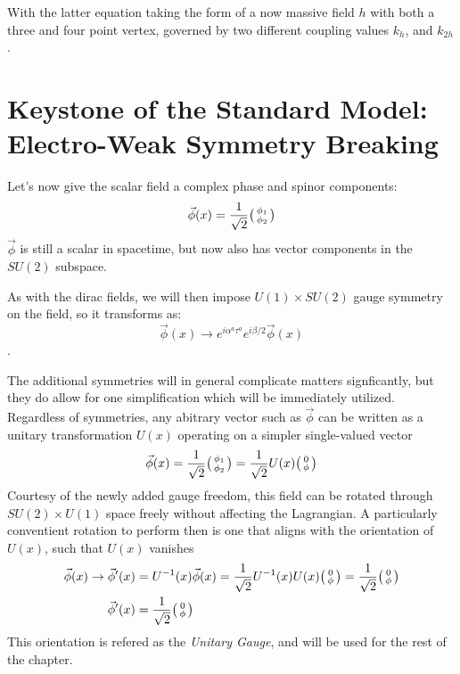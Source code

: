     With the latter equation taking the form of a now massive field $h$ with both a three and four point vertex,
        governed by two different coupling values $k_{h}$, and $k_{2h}$.

    \cite{Halzen_book}

    

\section{Keystone of the Standard Model: Electro-Weak Symmetry Breaking}

    Let's now give the scalar field a complex phase and spinor components:
    \begin{equation}
        \vec{\phi}(x) = \frac{1}{\sqrt{2}} \big(\begin{smallmatrix} \phi_1 \\ \phi_2 \end{smallmatrix}\big)
    \end{equation}
    $\vec{\phi}$ is still a scalar in spacetime, but now also has vector components in the $SU(2)$ subspace.

    As with the dirac fields, we will then impose $U(1) \times SU(2)$ gauge symmetry on the field, so it transforms as:
    \begin{equation}
        \vec{\phi}(x) \rightarrow e^{i \alpha^a \tau^a} e^{i \beta/2 } \vec{\phi}(x)
    \end{equation}.

    The additional symmetries will in general complicate matters signficantly,
        but they do allow for one simplification which will be immediately utilized.
    Regardless of symmetries, any abitrary vector such as $\vec{\phi}$ can be written as a unitary transformation $U(x)$ operating on a simpler single-valued vector
    \begin{equation}
        \vec{\phi}(x) = \frac{1}{\sqrt{2}} \big(\begin{smallmatrix} \phi_1 \\ \phi_2 \end{smallmatrix}\big) = \frac{1}{\sqrt{2}} U(x) \big(\begin{smallmatrix} 0 \\ \phi \end{smallmatrix}\big)
    \end{equation}
    Courtesy of the newly added gauge freedom, this field can be rotated through $SU(2) \times U(1)$ space freely without affecting the Lagrangian.
    A particularly conventient rotation to perform then is one that aligns with the orientation of $U(x)$, such that $U(x)$ vanishes
    \begin{equation} \begin{split}
        \vec{\phi}(x) \rightarrow \vec{\phi}'(x) 
            &= U^{-1}(x) \vec{\phi}(x)
            = \frac{1}{\sqrt{2}} U^{-1}(x) U(x) \big(\begin{smallmatrix} 0 \\ \phi \end{smallmatrix}\big)
            = \frac{1}{\sqrt{2}} \big(\begin{smallmatrix} 0 \\ \phi \end{smallmatrix}\big) \\
        \vec{\phi}'(x) &= \frac{1}{\sqrt{2}} \big(\begin{smallmatrix} 0 \\ \phi \end{smallmatrix}\big)
    \end{split} \end{equation}
    This orientation is refered as the \textit{Unitary Gauge}, and will be used for the rest of the chapter.


